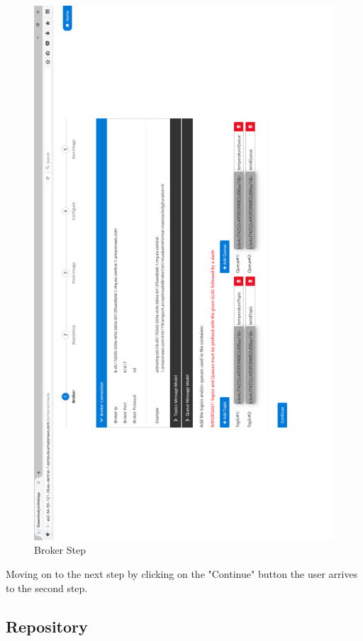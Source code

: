 \begin{figure}[p]
	\centering
	\noindent
	\includegraphics[width=0.5\paperwidth]{./images/guide/container/broker.PNG}
	\caption{Broker Step}
	\label{fig:broker}
\end{figure}

Moving on to the next step by clicking on the "Continue" button the user arrives to the second step.

\newpage

\subsection{Repository}
\label{chap:05:01:02}

